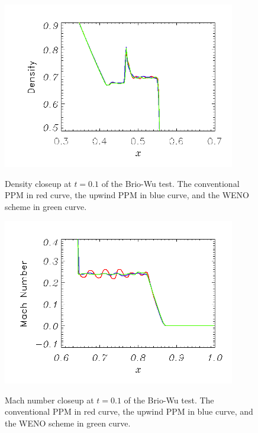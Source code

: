 \begin{figure}[!htbp]
\begin{center}
{\leavevmode\includegraphics[width=4in]{Lee_fig5}}
\end{center}
\caption{\label{fig:BrioWu_upwindPPM5} Density closeup at $t=0.1$ of the Brio-Wu test. 
The conventional PPM in red curve, the upwind PPM in blue curve, and the WENO scheme in green curve.
}
\end{figure}

\begin{figure}[!htbp]
\begin{center}
{\leavevmode\includegraphics[width=4in]{Lee_fig6}}
\end{center}
\caption{\label{fig:BrioWu_upwindPPM6} Mach number closeup at $t=0.1$ of the Brio-Wu test.
The conventional PPM in red curve, the upwind PPM in blue curve, and the WENO scheme in green curve.
}
\end{figure}




